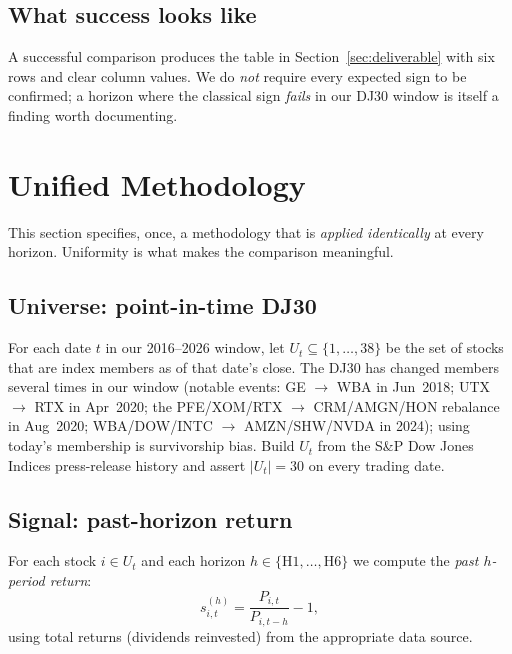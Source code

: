 \documentclass[11pt,letterpaper]{article}
\begin{document}
\subsection{What success looks like}

A successful comparison produces the table in Section~\ref{sec:deliverable} with six rows and clear column values. We do \emph{not} require every expected sign to be confirmed; a horizon where the classical sign \emph{fails} in our DJ30 window is itself a finding worth documenting.

\section{Unified Methodology}\label{sec:method}

This section specifies, once, a methodology that is \emph{applied identically} at every horizon. Uniformity is what makes the comparison meaningful.

\subsection{Universe: point-in-time DJ30}

For each date $t$ in our 2016--2026 window, let $U_t \subseteq \{1,\dots,38\}$ be the set of stocks that are index members as of that date's close. The DJ30 has changed members several times in our window (notable events: GE $\to$ WBA in Jun~2018; UTX $\to$ RTX in Apr~2020; the PFE/XOM/RTX $\to$ CRM/AMGN/HON rebalance in Aug~2020; WBA/DOW/INTC $\to$ AMZN/SHW/NVDA in 2024); using today's membership is survivorship bias. Build $U_t$ from the S\&P Dow Jones Indices press-release history and assert $|U_t|=30$ on every trading date.

\subsection{Signal: past-horizon return}

For each stock $i\in U_t$ and each horizon $h\in\{\text{H1},\dots,\text{H6}\}$ we compute the \emph{past $h$-period return}:
\begin{equation}
s^{(h)}_{i,t} = \frac{P_{i,t}}{P_{i,t-h}} - 1,
\label{eq:signal}
\end{equation}
using total returns (dividends reinvested) from the appropriate data source.
\end{document}

